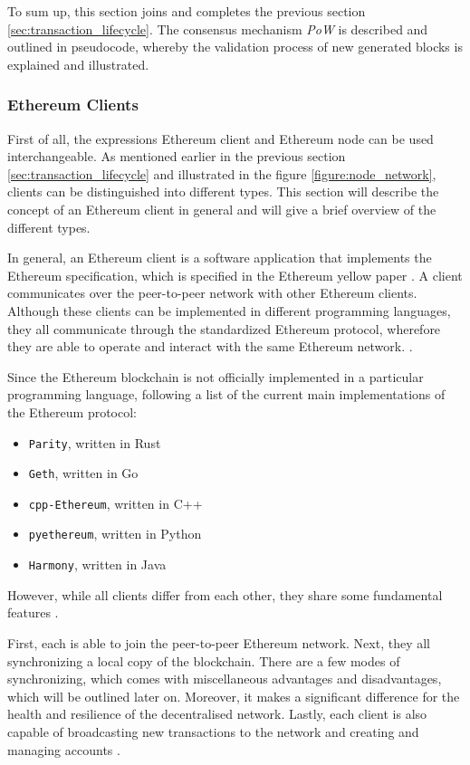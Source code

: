 To sum up, this section joins and completes the previous section \ref{sec:transaction_lifecycle}.
The consensus mechanism \textit{PoW} is described and outlined in pseudocode, whereby
the validation process of new generated blocks is explained and illustrated.
\clearpage

\subsubsection{Ethereum Clients}
\label{sec:nodes}

First of all, the expressions Ethereum client and Ethereum node can be used interchangeable. 
As mentioned earlier in the previous section \ref{sec:transaction_lifecycle} 
and illustrated in the figure \ref{figure:node_network}, clients can be distinguished into different types. 
This section will describe the concept of an Ethereum client in general and will give a brief overview of the different
types.

In general, an Ethereum client is a software application 
that implements the Ethereum specification, which is specified in the Ethereum yellow paper .
A client communicates over the peer-to-peer network with other Ethereum clients.
Although these clients can be implemented in different programming languages, they all communicate through
the standardized Ethereum protocol, wherefore they are able 
to operate and interact with the same Ethereum network. . 

Since the Ethereum blockchain is not officially implemented in a particular programming language, 
following a list of the current main implementations of the Ethereum protocol:

\begin{itemize}
	\item \texttt{Parity}, written in Rust
	\item \texttt{Geth}, written in Go
	\item \texttt{cpp-Ethereum}, written in C++
	\item \texttt{pyethereum}, written in Python
	\item \texttt{Harmony}, written in Java 
\end{itemize}

However, while all clients differ from each other, they share some fundamental features .

First, each is able to join the peer-to-peer Ethereum network. 
Next, they all synchronizing a local copy of the blockchain.
There are a few modes of synchronizing, which comes with miscellaneous advantages and disadvantages, 
which will be outlined later on. Moreover, it makes a significant difference 
for the health and resilience of the decentralised network. 
Lastly, each client is also capable of broadcasting new transactions to the network and creating and 
managing accounts .

